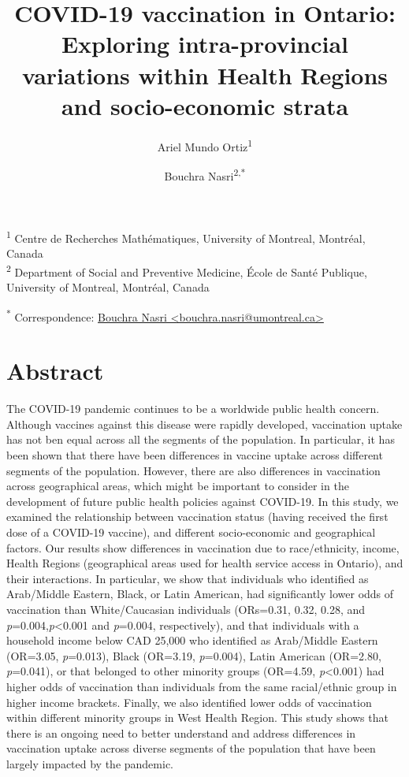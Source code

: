 \documentclass[
  letterpaper,
  DIV=11,
  numbers=noendperiod]{scrartcl}
\title{\textbf{COVID-19 vaccination in Ontario: Exploring
intra-provincial variations within Health Regions and socio-economic
strata}}
\author{Ariel Mundo Ortiz\textsuperscript{1} \and Bouchra
Nasri\textsuperscript{2,*}}
\date{}
\begin{document}
\maketitle
\ifdefined\Shaded\renewenvironment{Shaded}{\begin{tcolorbox}[frame hidden, enhanced, sharp corners, interior hidden, borderline west={3pt}{0pt}{shadecolor}, breakable, boxrule=0pt]}{\end{tcolorbox}}\fi

\textsuperscript{1} Centre de Recherches Mathématiques, University of
Montreal, Montréal, Canada\\
\textsuperscript{2} Department of Social and Preventive Medicine, École
de Santé Publique, University of Montreal, Montréal, Canada

\textsuperscript{*} Correspondence:
\href{mailto:bouchra.nasri@umontreal.ca}{Bouchra Nasri
\textless{}bouchra.nasri@umontreal.ca\textgreater{}}

\hypertarget{abstract}{%
\section{Abstract}\label{abstract}}

The COVID-19 pandemic continues to be a worldwide public health concern.
Although vaccines against this disease were rapidly developed,
vaccination uptake has not ben equal across all the segments of the
population. In particular, it has been shown that there have been
differences in vaccine uptake across different segments of the
population. However, there are also differences in vaccination across
geographical areas, which might be important to consider in the
development of future public health policies against COVID-19. In this
study, we examined the relationship between vaccination status (having
received the first dose of a COVID-19 vaccine), and different
socio-economic and geographical factors. Our results show differences in
vaccination due to race/ethnicity, income, Health Regions (geographical
areas used for health service access in Ontario), and their
interactions. In particular, we show that individuals who identified as
Arab/Middle Eastern, Black, or Latin American, had significantly lower
odds of vaccination than White/Caucasian individuals (ORs=0.31, 0.32,
0.28, and \emph{p}=0.004,\emph{p}\textless0.001 and \emph{p}=0.004,
respectively), and that individuals with a household income below CAD
25,000 who identified as Arab/Middle Eastern (OR=3.05, \emph{p}=0.013),
Black (OR=3.19, \emph{p}=0.004), Latin American (OR=2.80,
\emph{p}=0.041), or that belonged to other minority groups (OR=4.59,
\emph{p}\textless0.001) had higher odds of vaccination than individuals
from the same racial/ethnic group in higher income brackets. Finally, we
also identified lower odds of vaccination within different minority
groups in West Health Region. This study shows that there is an ongoing
need to better understand and address differences in vaccination uptake
across diverse segments of the population that have been largely
impacted by the pandemic.
\end{document}
